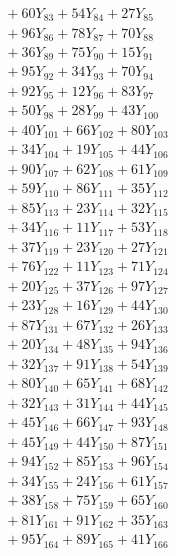 \documentclass[a4paper,10pt]{article}
\begin{document}
{\begin{align}
&\;  + 60 Y_{83} + 54 Y_{84} + 27 Y_{85} \\[0.3ex]
&\;  + 96 Y_{86} + 78 Y_{87} + 70 Y_{88} \\[0.5ex]\allowbreak
&\;  + 36 Y_{89} + 75 Y_{90} + 15 Y_{91} \\[0.3ex]
&\;  + 95 Y_{92} + 34 Y_{93} + 70 Y_{94} \\[0.3ex]
&\;  + 92 Y_{95} + 12 Y_{96} + 83 Y_{97} \\[0.3ex]
&\;  + 50 Y_{98} + 28 Y_{99} + 43 Y_{100} \\[0.3ex]
&\;  + 40 Y_{101} + 66 Y_{102} + 80 Y_{103} \\[0.3ex]
&\;  + 34 Y_{104} + 19 Y_{105} + 44 Y_{106} \\[0.3ex]
&\;  + 90 Y_{107} + 62 Y_{108} + 61 Y_{109} \\[0.3ex]
&\;  + 59 Y_{110} + 86 Y_{111} + 35 Y_{112} \\[0.3ex]
&\;  + 85 Y_{113} + 23 Y_{114} + 32 Y_{115} \\[0.3ex]
&\;  + 34 Y_{116} + 11 Y_{117} + 53 Y_{118} \\[0.5ex]\allowbreak
&\;  + 37 Y_{119} + 23 Y_{120} + 27 Y_{121} \\[0.3ex]
&\;  + 76 Y_{122} + 11 Y_{123} + 71 Y_{124} \\[0.3ex]
&\;  + 20 Y_{125} + 37 Y_{126} + 97 Y_{127} \\[0.3ex]
&\;  + 23 Y_{128} + 16 Y_{129} + 44 Y_{130} \\[0.3ex]
&\;  + 87 Y_{131} + 67 Y_{132} + 26 Y_{133} \\[0.3ex]
&\;  + 20 Y_{134} + 48 Y_{135} + 94 Y_{136} \\[0.3ex]
&\;  + 32 Y_{137} + 91 Y_{138} + 54 Y_{139} \\[0.3ex]
&\;  + 80 Y_{140} + 65 Y_{141} + 68 Y_{142} \\[0.3ex]
&\;  + 32 Y_{143} + 31 Y_{144} + 44 Y_{145} \\[0.3ex]
&\;  + 45 Y_{146} + 66 Y_{147} + 93 Y_{148} \\[0.5ex]\allowbreak
&\;  + 45 Y_{149} + 44 Y_{150} + 87 Y_{151} \\[0.3ex]
&\;  + 94 Y_{152} + 85 Y_{153} + 96 Y_{154} \\[0.3ex]
&\;  + 34 Y_{155} + 24 Y_{156} + 61 Y_{157} \\[0.3ex]
&\;  + 38 Y_{158} + 75 Y_{159} + 65 Y_{160} \\[0.3ex]
&\;  + 81 Y_{161} + 91 Y_{162} + 35 Y_{163} \\[0.3ex]
&\;  + 95 Y_{164} + 89 Y_{165} + 41 Y_{166} \\[0.3ex]

\end{align}}
\end{document}
